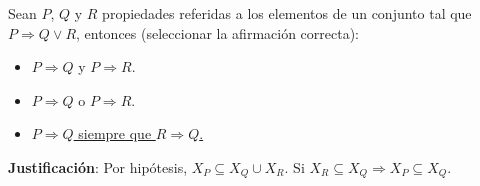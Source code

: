 \documentclass[12pt]{article}
\newcounter{ejercicio}[section] %
\newcounter{ejercicio}
\begin{document}
    \begin{ejercicio}
        Sean $P$, $Q$ y $R$ propiedades referidas a los elementos de un conjunto tal que $P \Rightarrow Q \lor R$, entonces (seleccionar la afirmación correcta):
        \begin{itemize}
            \item $P \Rightarrow Q$ y $P \Rightarrow R$.
            \item $P \Rightarrow Q$ o $P \Rightarrow R$.
            \item \underline{$P \Rightarrow Q$ siempre que $R \Rightarrow Q$.}
        \end{itemize}

        \noindent
        \textbf{Justificación}:
        Por hipótesis, $X_P \subseteq X_Q \cup X_R$.\newline
        Si $X_R \subseteq X_Q \Rightarrow X_P \subseteq X_Q$.

    \end{ejercicio}
    
\end{document}
